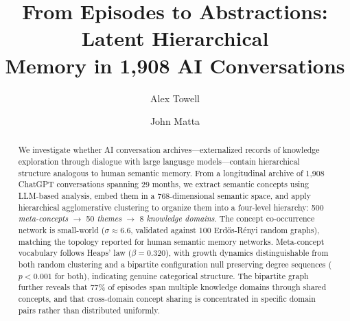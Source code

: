 \documentclass{svproc}
\begin{document}
\mainmatter

\title{From Episodes to Abstractions: Latent Hierarchical\\Memory in 1,908 AI Conversations}


\author{Alex Towell \and John Matta}


\maketitle

\begin{abstract}
We investigate whether AI conversation archives---externalized records of
knowledge exploration through dialogue with large language models---contain
hierarchical structure analogous to human semantic memory. From a longitudinal
archive of 1,908 ChatGPT conversations spanning 29 months, we extract semantic
concepts using LLM-based analysis, embed them in a 768-dimensional semantic
space, and apply hierarchical agglomerative clustering to organize them into a
four-level hierarchy: 500 \emph{meta-concepts} $\to$ 50 \emph{themes} $\to$ 8
\emph{knowledge domains}. The concept co-occurrence network is
small-world ($\sigma \approx 6.6$, validated against 100
Erd\H{o}s-R\'{e}nyi random graphs), matching the topology reported for
human semantic memory networks. Meta-concept vocabulary follows Heaps' law
($\beta = 0.320$), with growth dynamics distinguishable from both random
clustering and a bipartite configuration null preserving degree sequences
($p < 0.001$ for both), indicating genuine categorical structure.
The bipartite graph further reveals that 77\% of episodes span multiple
knowledge domains through shared concepts, and that cross-domain concept
sharing is concentrated in specific domain pairs rather than distributed
uniformly.
\end{abstract}

\end{document}
